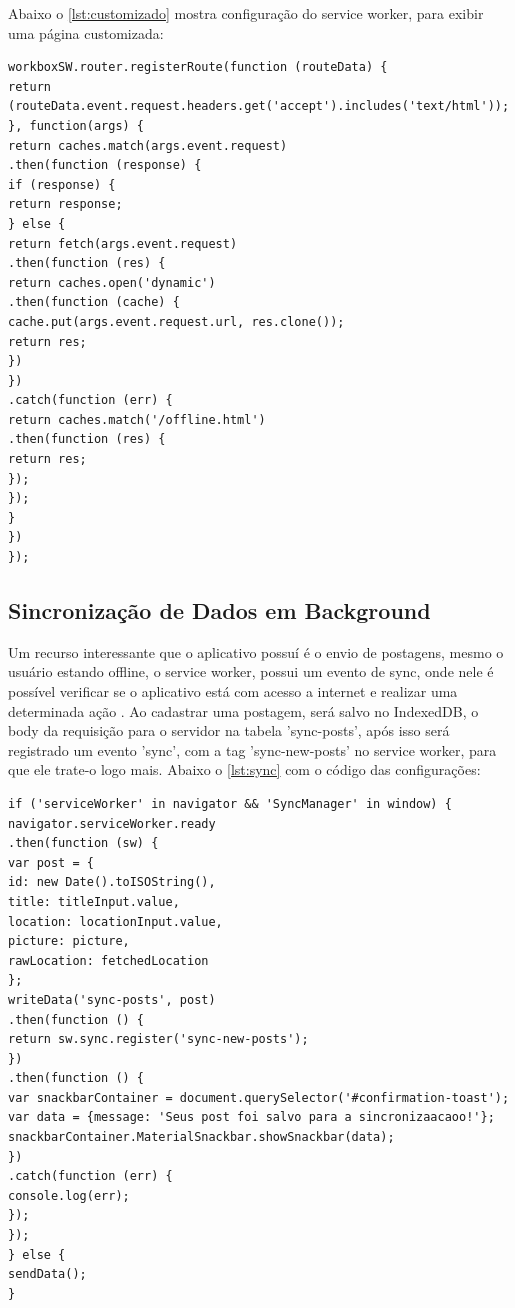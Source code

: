 Abaixo  o \autoref{lst:customizado} mostra configuração do service worker, para exibir uma página customizada:

\newpage

\begin{lstlisting}[frame=single,label=lst:customizado,caption=Página offline customizada, basicstyle=\footnotesize]
workboxSW.router.registerRoute(function (routeData) {
return (routeData.event.request.headers.get('accept').includes('text/html'));
}, function(args) {
return caches.match(args.event.request)
.then(function (response) {
if (response) {
return response;
} else {
return fetch(args.event.request)
.then(function (res) {
return caches.open('dynamic')
.then(function (cache) {
cache.put(args.event.request.url, res.clone());
return res;
})
})
.catch(function (err) {
return caches.match('/offline.html')
.then(function (res) {
return res;
});
});
}
})
});
\end{lstlisting}

\vspace{-0.75cm}
\begin{center}
\end{center}

\subsection*{Sincronização de Dados em Background}
Um recurso interessante que o aplicativo possuí é o envio de postagens, mesmo o usuário estando offline, o service worker, possui um evento de sync, onde nele é possível verificar se o aplicativo está com acesso a internet e realizar uma determinada ação \cite{servicework}. 
\newline{}
Ao cadastrar uma postagem, será salvo no IndexedDB, o body da requisição para o servidor na tabela 'sync-posts', após isso será registrado um evento 'sync', com a tag 'sync-new-posts' no service worker, para que ele trate-o logo mais. Abaixo o \autoref{lst:sync} com o código das configurações:
\begin{lstlisting}[frame=single,label=lst:sync,caption=Sicronização Em Background, basicstyle=\footnotesize]
if ('serviceWorker' in navigator && 'SyncManager' in window) {
navigator.serviceWorker.ready
.then(function (sw) {
var post = {
id: new Date().toISOString(),
title: titleInput.value,
location: locationInput.value,
picture: picture,
rawLocation: fetchedLocation
};
writeData('sync-posts', post)
.then(function () {
return sw.sync.register('sync-new-posts');
})
.then(function () {
var snackbarContainer = document.querySelector('#confirmation-toast');
var data = {message: 'Seus post foi salvo para a sincronizaacaoo!'};
snackbarContainer.MaterialSnackbar.showSnackbar(data);
})
.catch(function (err) {
console.log(err);
});
});
} else {
sendData();
}
\end{lstlisting}
\vspace{-0.75cm}
\begin{center}
\end{center}



